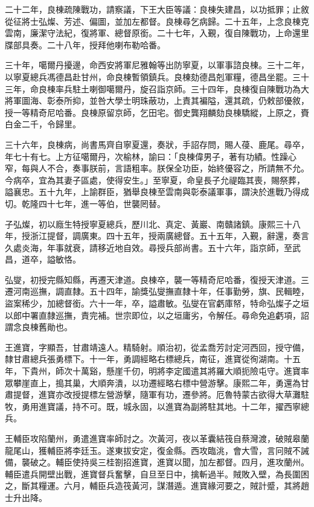 \begin{pinyinscope}
二十二年，良棟疏陳戰功，請察議，下王大臣等議：良棟失建昌，以功抵罪；止敘從征將士弘燦、芳述、偏圖，並加左都督。良棟尋乞病歸。二十五年，上念良棟克雲南，廉潔守法紀，復將軍、總督原銜。二十七年，入覲，復自陳戰功，上命還里牒部具奏。二十八年，授拜他喇布勒哈番。

三十年，噶爾丹擾邊，命西安將軍尼雅翰等出防寧夏，以軍事諮良棟。三十二年，以寧夏總兵馮德昌赴甘州，命良棟暫領鎮兵。良棟劾德昌剋軍糧，德昌坐罷。三十三年，命良棟率兵駐土喇御噶爾丹，旋召詣京師。三十四年，良棟復自陳戰功為大將軍圖海、彰泰所抑，並咎大學士明珠蔽功，上責其褊隘，還其疏，仍敕部優敘，授一等精奇尼哈番。良棟原留京師，乞田宅。御史龔翔麟劾良棟驕縱，上原之，賚白金二千，令歸里。

三十六年，良棟病，尚書馬齊自寧夏還，奏狀，手詔存問，賜人葠、鹿尾。尋卒，年七十有七。上方征噶爾丹，次榆林，諭曰：「良棟偉男子，著有功績。性躁心窄，每與人不合，奏事朕前，言語粗率。朕保全功臣，始終優容之，所請無不允。今病卒，宜為其妻子區處，使得安生。」至寧夏，命皇長子允禔臨其喪，賜祭葬，謚襄忠。五十九年，上諭群臣，猶舉良棟至雲南與彰泰議軍事，謂決於進戰乃得成切。乾隆四十七年，進一等伯，世襲罔替。

子弘燦，初以廕生特授寧夏總兵，歷川北、真定、黃巖、南贛諸鎮。康熙三十八年，授浙江提督，調廣東。四十五年，授兩廣總督。五十五年，入覲，辭還，奏言久處炎海，年事就衰，請移近地自效。尋授兵部尚書。五十六年，詣京師，至武昌，道卒，謚敏恪。

弘燮，初授完縣知縣，再遷天津道。良棟卒，襲一等精奇尼哈番，復授天津道。三遷河南巡撫，調直隸。五十四年，諭獎弘燮撫直隸十年，任事勤勞，旗、民輯睦，盜案稀少，加總督銜。六十一年，卒，謚肅敏。弘燮在官虧庫帑，特命弘燦子之垣以郎中署直隸巡撫，責完補。世宗即位，以之垣庸劣，令解任。尋命免追虧項，詔謂念良棟舊勛也。

王進寶，字顯吾，甘肅靖遠人。精騎射。順治初，從孟喬芳討定河西回，授守備，隸甘肅總兵張勇標下。十一年，勇調經略右標總兵，南征，進寶從徇湖南。十五年，下貴州，師次十萬谿，懸崖千仞，明將李定國遣其將羅大順扼險屯守。進寶率眾攀崖直上，搗其巢，大順奔潰，以功遷經略右標中營游擊。康熙二年，勇還為甘肅提督，進寶亦改授提標左營游擊，隨軍有功，遷參將。厄魯特蒙古欲得大草灘駐牧，勇用進寶議，持不可。既，城永固，以進寶為副將駐其地。十二年，擢西寧總兵。

王輔臣攻陷蘭州，勇遣進寶率師討之。次黃河，夜以革囊結筏自蔡灣渡，破賊皋蘭龍尾山，獲輔臣將李廷玉。遂東拔安定，復金縣。西攻臨洮，會大雪，言冋賊不誡備，襲破之。輔臣使持吳三桂劄招進寶，進寶以聞，加左都督。四月，進攻蘭州。輔臣遣兵開壁出戰，進寶督兵奮擊，自旦至日中，擒斬過半。賊敗入壁，為長圍困之，斷其糧運。六月，輔臣兵造筏黃河，謀潛遁。進寶緣河要之，賊計蹙，其將趙士升出降。


\end{pinyinscope}
